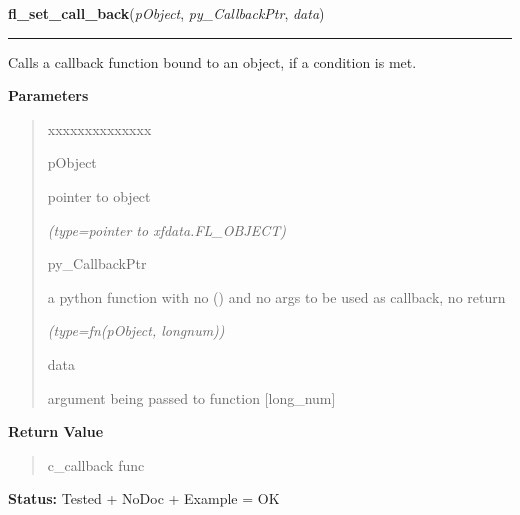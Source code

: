     \vspace{0.5ex}

\hspace{.8\funcindent}\begin{boxedminipage}{\funcwidth}

    \raggedright \textbf{fl\_set\_call\_back}(\textit{pObject}, \textit{py\_CallbackPtr}, \textit{data})

    \vspace{-1.5ex}

    \rule{\textwidth}{0.5\fboxrule}
\setlength{\parskip}{2ex}
    Calls a callback function bound to an object, if a condition is met.

\setlength{\parskip}{1ex}
      \textbf{Parameters}
      \vspace{-1ex}

      \begin{quote}
        \begin{Ventry}{xxxxxxxxxxxxxx}

          \item[pObject]

          pointer to object

            {\it (type=pointer to xfdata.FL\_OBJECT)}

          \item[py\_CallbackPtr]

          a python function with no () and no args to be used as callback, 
          no return

            {\it (type=fn(pObject, longnum))}

          \item[data]

          argument being passed to function [long\_num]

        \end{Ventry}

      \end{quote}

      \textbf{Return Value}
    \vspace{-1ex}

      \begin{quote}
      c\_callback func

      \end{quote}

\textbf{Status:} Tested + NoDoc + Example = OK



    \end{boxedminipage}

